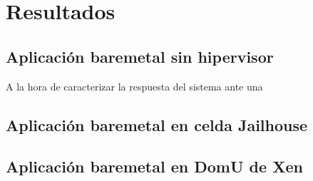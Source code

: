 \chapter{Resultados}

\section{Aplicación baremetal sin hipervisor}
A la hora de caracterizar la respuesta del sistema ante una

\section{Aplicación baremetal en celda Jailhouse}

\section{Aplicación baremetal en DomU de Xen}
